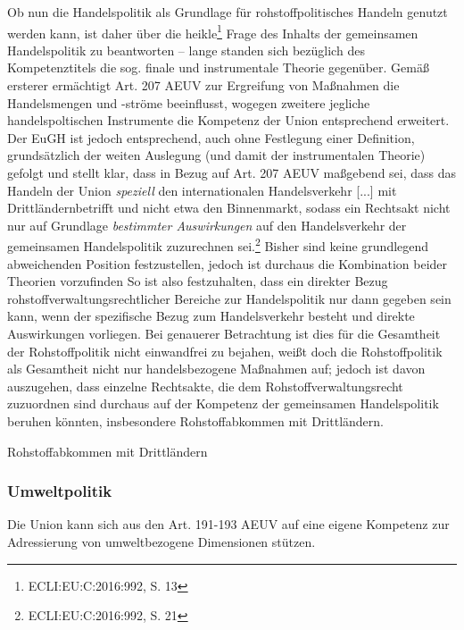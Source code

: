 \documentclass[12pt,a4paper,oneside]{book} %
\begin{document}
Ob nun die Handelspolitik als Grundlage für rohstoffpolitisches Handeln genutzt werden kann, ist daher über die \glqq heikle\grqq \footnote{ECLI:EU:C:2016:992, S. 13} Frage des Inhalts der gemeinsamen Handelspolitik zu beantworten -- lange standen sich bezüglich des Kompetenztitels die sog. finale und instrumentale Theorie gegenüber. Gemäß ersterer ermächtigt Art. 207 AEUV zur Ergreifung von Maßnahmen die Handelsmengen und -ströme beeinflusst, wogegen zweitere jegliche handelspoltischen Instrumente die Kompetenz der Union entsprechend erweitert.\autocite{Callies/Ruffert, Art. 207, Rn. 11} Der EuGH ist jedoch entsprechend, auch ohne Festlegung einer Definition, grundsätzlich der weiten Auslegung (und damit der instrumentalen Theorie) gefolgt und stellt klar, dass in Bezug auf Art. 207 AEUV maßgebend sei, dass das \glqq Handeln der Union \textit{speziell} den internationalen Handelsverkehr [...] mit Drittländern\grqq betrifft und nicht etwa den Binnenmarkt, sodass ein Rechtsakt nicht nur auf Grundlage \textit{bestimmter Auswirkungen} auf den Handelsverkehr der gemeinsamen Handelspolitik zuzurechnen sei.\footnote{ECLI:EU:C:2016:992, S. 21}
Bisher sind  keine grundlegend abweichenden Position festzustellen, jedoch ist durchaus die Kombination beider Theorien vorzufinden\autocites{Callies/Ruffert, Art. 207, Rn. 11}{Müller-Ibold, in: Lenz/Borchardt (Hrsg.), EU-Verträge, Vorb. zu Art. 206, Rn. 4;}{Weiß, in: Grabitz/Hilf/Nettesheim, EU, Art. 207, Rn. 69.}
So ist also festzuhalten, dass ein direkter Bezug rohstoffverwaltungsrechtlicher Bereiche zur Handelspolitik nur dann gegeben sein kann, wenn der spezifische Bezug zum Handelsverkehr besteht und direkte Auswirkungen vorliegen. Bei genauerer Betrachtung ist dies für die Gesamtheit der Rohstoffpolitik nicht einwandfrei zu bejahen, weißt doch die Rohstoffpolitik als Gesamtheit nicht nur handelsbezogene Maßnahmen auf; jedoch ist davon auszugehen, dass einzelne Rechtsakte, die dem Rohstoffverwaltungsrecht zuzuordnen sind durchaus auf der Kompetenz der gemeinsamen Handelspolitik beruhen könnten, insbesondere Rohstoffabkommen mit Drittländern.
	
	
Rohstoffabkommen mit Drittländern
	
	
\subsubsection{Umweltpolitik}
Die Union kann sich aus den Art. 191-193 AEUV auf eine eigene Kompetenz zur Adressierung von umweltbezogene Dimensionen stützen.
	
\end{document}
